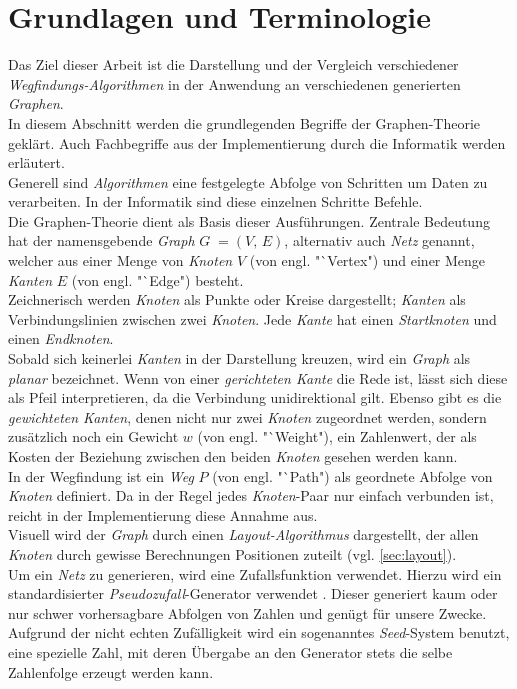 \documentclass[12pt]{article}
\begin{document}
\section{Grundlagen und Terminologie}
\label{sec:basics}
Das Ziel dieser Arbeit ist die Darstellung und der Vergleich verschiedener \textit{Wegfindungs-Algorithmen} in der Anwendung an verschiedenen generierten \textit{Graphen}.
\\
In diesem Abschnitt werden die grundlegenden Begriffe der Graphen-Theorie geklärt. Auch Fachbegriffe aus der Implementierung durch die Informatik werden erläutert.
\\
Generell sind \textit{Algorithmen} eine festgelegte Abfolge von Schritten um Daten zu verarbeiten. In der Informatik sind diese einzelnen Schritte Befehle.
\\
Die Graphen-Theorie dient als Basis dieser Ausführungen. Zentrale Bedeutung hat der namensgebende \textit{Graph} $G\; = (V,\,E)$, alternativ auch \textit{Netz} genannt, welcher aus einer Menge von \textit{Knoten} $V$ (von engl. "`Vertex") und einer Menge \textit{Kanten} $E$ (von engl. "`Edge") besteht.
\\
Zeichnerisch werden \textit{Knoten} als Punkte oder Kreise dargestellt; \textit{Kanten} als Verbindungslinien zwischen zwei \textit{Knoten}. Jede \textit{Kante} hat einen \textit{Startknoten} und einen \textit{Endknoten}. 
\\
Sobald sich keinerlei \textit{Kanten} in der Darstellung kreuzen, wird ein \textit{Graph} als \textit{planar} bezeichnet. Wenn von einer \textit{gerichteten Kante} die Rede ist, lässt sich diese als Pfeil interpretieren, da die Verbindung unidirektional gilt. Ebenso gibt es die \textit{gewichteten Kanten}, denen nicht nur zwei \textit{Knoten} zugeordnet werden, sondern zusätzlich noch ein Gewicht $w$ (von engl. "`Weight"), ein Zahlenwert, der als Kosten der Beziehung zwischen den beiden \textit{Knoten} gesehen werden kann.
\\
In der Wegfindung ist ein \textit{Weg} $P$ (von engl. "`Path") als geordnete Abfolge von \textit{Knoten} definiert. Da in der Regel jedes \textit{Knoten}-Paar nur einfach verbunden ist, reicht in der Implementierung diese Annahme aus.
\\
Visuell wird der \textit{Graph} durch einen \textit{Layout-Algorithmus} dargestellt, der allen \textit{Knoten} durch gewisse Berechnungen Positionen zuteilt (vgl. \autoref{sec:layout}).
\\
Um ein \textit{Netz} zu generieren, wird eine Zufallsfunktion verwendet. Hierzu wird ein standardisierter \textit{Pseudozufall}-Generator verwendet \cite{random}. Dieser generiert kaum oder nur schwer vorhersagbare Abfolgen von Zahlen und genügt für unsere Zwecke. Aufgrund der nicht echten Zufälligkeit wird ein sogenanntes \textit{Seed}-System benutzt, eine spezielle Zahl, mit deren Übergabe an den Generator stets die selbe Zahlenfolge erzeugt werden kann.
\newpage
\end{document}
